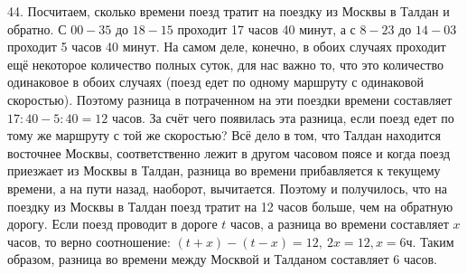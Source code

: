 44. Посчитаем, сколько времени поезд тратит на поездку из Москвы в Талдан и обратно. С $00-35$ до $18-15$ проходит 17 часов 40 минут, а с $8-23$ до $14-03$ проходит 5 часов 40 минут. На самом деле, конечно, в обоих случаях проходит ещё некоторое количество полных суток, для нас важно то, что это количество одинаковое в обоих случаях (поезд едет по одному маршруту с одинаковой скоростью). Поэтому разница в потраченном на эти поездки времени составляет $17:40-5:40=12$ часов. За счёт чего появилась эта разница, если поезд едет по тому же маршруту с той же скоростью? Всё дело в том, что Талдан находится восточнее Москвы, соответственно лежит в другом часовом поясе и когда поезд приезжает из Москвы в Талдан, разница во времени прибавляется к текущему времени, а на пути назад, наоборот, вычитается. Поэтому и получилось, что на поездку из Москвы в Талдан поезд тратит на 12 часов больше, чем на обратную дорогу. Если поезд проводит в дороге $t$ часов, а разница во времени составляет $x$ часов, то верно соотношение: $(t+x)-(t-x)=12,\ 2x=12, x=6$ч. Таким образом, разница во времени между Москвой и Талданом составляет 6 часов.\\
